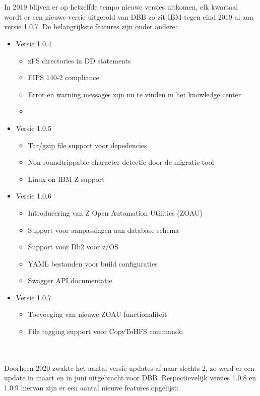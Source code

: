 \\ \\
In 2019 blijven er op hetzelfde tempo nieuwe versies uitkomen, elk kwartaal wordt er een nieuwe versie uitgerold van DBB zo zit IBM tegen eind 2019 al aan versie 1.0.7.
De belangrijkste features zijn onder andere:
\begin{itemize}
    \item Versie 1.0.4
    \begin{itemize}
        \item zFS directories in DD statements
        \item FIPS 140-2 compliance
        \item Error en warning messages zijn nu te vinden in het knowledge center
        \item
    \end{itemize}
    \item Versie 1.0.5
    \begin{itemize}
        \item Tar/gzip file support voor depedencies
        \item Non-roundtrippable character detectie door de migratie tool
        \item Linux on IBM Z support
    \end{itemize}
    \item Versie 1.0.6
    \begin{itemize}
        \item Introducering van Z Open Automation Utilities (ZOAU)
        \item Support voor aanpassingen aan database schema
        \item Support voor Db2 voor z/OS
        \item YAML bestanden voor build configuraties
        \item Swagger API documentatie
    \end{itemize}
    \item Versie 1.0.7
    \begin{itemize}
        \item Toevoeging van nieuwe ZOAU functionaliteit
        \item File tagging support voor CopyToHFS commando
    \end{itemize}
\end{itemize}
\\ \\
Doorheen 2020 zwakte het aantal versie-updates af naar slechts 2, zo werd er een update in maart en in juni uitgebracht voor DBB. Respectievelijk versies 1.0.8 en 1.0.9 hiervan zijn er een aantal nieuwe features opgelijst:
